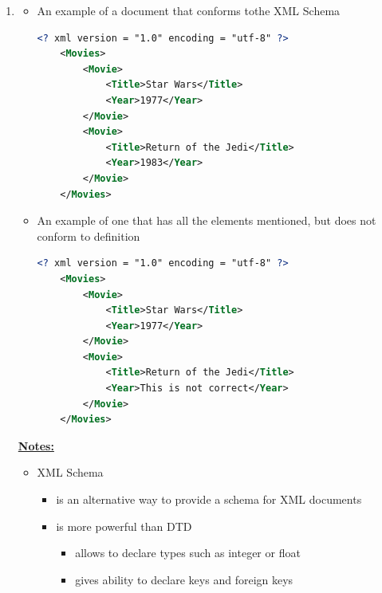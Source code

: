 \documentclass[12pt]{article}
\begin{document}
\begin{enumerate}[1.]
\begin{lstlisting}[language=XML]
    ]>
    \end{lstlisting}

    \item

    \begin{itemize}
        \item An example of a document that conforms tothe XML Schema


    \begin{lstlisting}[language=XML]
    <? xml version = "1.0" encoding = "utf-8" ?>
    <Movies>
        <Movie>
            <Title>Star Wars</Title>
            <Year>1977</Year>
        </Movie>
        <Movie>
            <Title>Return of the Jedi</Title>
            <Year>1983</Year>
        </Movie>
    </Movies>
    \end{lstlisting}

        \item An example of one that has all the elements mentioned, but does not conform to
        definition

    \begin{lstlisting}[language=XML]
    <? xml version = "1.0" encoding = "utf-8" ?>
    <Movies>
        <Movie>
            <Title>Star Wars</Title>
            <Year>1977</Year>
        </Movie>
        <Movie>
            <Title>Return of the Jedi</Title>
            <Year>This is not correct</Year>
        </Movie>
    </Movies>
    \end{lstlisting}


    \end{itemize}

    \bigskip

    \underline{\textbf{Notes:}}

    \bigskip

    \begin{itemize}
        \item XML Schema
        \begin{itemize}
            \item is an alternative way to provide a schema for XML documents
            \item is more powerful than DTD
            \begin{itemize}
                \item allows to declare types such as integer or float
                \item gives ability to declare keys and foreign keys
            \end{itemize}
        \end{itemize}


\end{itemize}
\end{enumerate}
\end{document}
